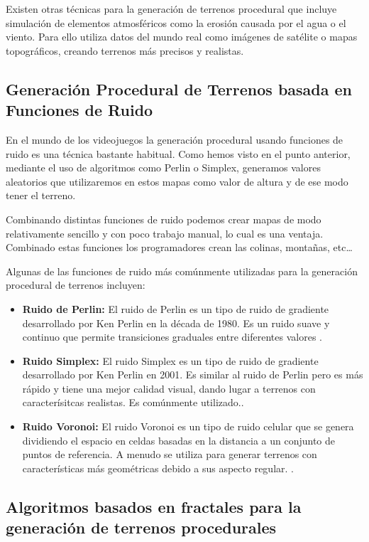 Existen otras técnicas para la generación de terrenos procedural que incluye simulación de elementos atmosféricos como la erosión causada por el agua o el viento. Para ello utiliza datos del mundo real como imágenes de satélite o mapas topográficos, creando terrenos más precisos y realistas.

\subsection{Generación Procedural de Terrenos basada en Funciones de Ruido}

En el mundo de los videojuegos la generación procedural usando funciones de ruido es una técnica bastante habitual. Como hemos visto en el punto anterior, mediante el uso de algoritmos como Perlin o Simplex, generamos valores aleatorios que utilizaremos en estos mapas como valor de altura y de ese modo tener el terreno.

Combinando distintas funciones de ruido podemos crear mapas de modo relativamente sencillo y con poco trabajo manual, lo cual es una ventaja. Combinado estas funciones los programadores crean las colinas, montañas, etc…

Algunas de las funciones de ruido más comúnmente utilizadas para la generación procedural de terrenos incluyen:
\begin{itemize}
    \item \textbf{Ruido de Perlin:} El ruido de Perlin es un tipo de ruido de gradiente desarrollado por Ken Perlin en la década de 1980. Es un ruido suave y continuo que permite transiciones graduales entre diferentes valores \cite{perlinnoise}.
    
    \item \textbf{Ruido Simplex:} El ruido Simplex es un tipo de ruido de gradiente desarrollado por Ken Perlin en 2001. Es similar al ruido de Perlin pero es más rápido y tiene una mejor calidad visual, dando lugar a terrenos con caracterísitcas realistas. Es comúnmente utilizado.\cite{simplexnoise}.
    
    \item \textbf{Ruido Voronoi:} El ruido Voronoi es un tipo de ruido celular que se genera dividiendo el espacio en celdas basadas en la distancia a un conjunto de puntos de referencia. A menudo se utiliza para generar terrenos con características más geométricas debido a sus aspecto regular. \cite{voronoinoise}.
\end{itemize}

\subsection{Algoritmos basados en fractales para la generación de terrenos procedurales}

